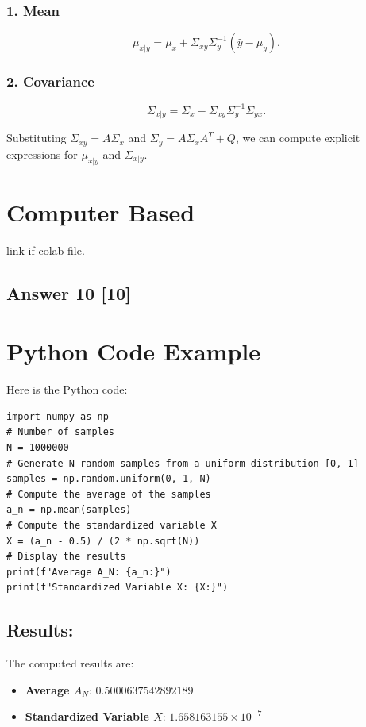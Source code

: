 \documentclass[12pt]{article}
\begin{document}
\subsubsection*{1. Mean}
\[
\mu_{x|y} = \mu_x + \Sigma_{xy} \Sigma_y^{-1} (\hat{y} - \mu_y).
\]

\subsubsection*{2. Covariance}
\[
\Sigma_{x|y} = \Sigma_x - \Sigma_{xy} \Sigma_y^{-1} \Sigma_{yx}.
\]

Substituting \( \Sigma_{xy} = A \Sigma_x \) and \( \Sigma_y = A \Sigma_x A^T + Q \), we can compute explicit expressions for \( \mu_{x|y} \) and \( \Sigma_{x|y} \).

\section{Computer Based}
\href{https://colab.research.google.com/drive/1HwIdLMlzcBsNvkJgrYGyu2AyvWHZYkG6?usp=sharing}{link if colab file}.
\subsection*{Answer 10 [10]}
\section*{Python Code Example}

Here is the Python code:

\begin{verbatim}
import numpy as np
# Number of samples
N = 1000000
# Generate N random samples from a uniform distribution [0, 1]
samples = np.random.uniform(0, 1, N)
# Compute the average of the samples
a_n = np.mean(samples)
# Compute the standardized variable X
X = (a_n - 0.5) / (2 * np.sqrt(N))
# Display the results
print(f"Average A_N: {a_n:}")
print(f"Standardized Variable X: {X:}")
\end{verbatim}

\subsection*{Results:}
The computed results are:
\begin{itemize}
    \item \textbf{Average \( A_N \)}: \(  0.5000637542892189  \)
    \item \textbf{Standardized Variable \( X \)}: \( 1.658163155 \times 10^{-7} \)
\end{itemize}
\end{document}
